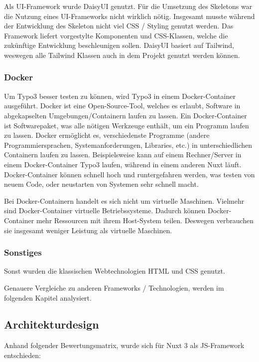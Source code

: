 Als UI-Framework wurde DaisyUI genutzt. Für die Umsetzung des Skeletons war die Nutzung eines UI-Frameworks nicht wirklich nötig. Insgesamt musste während der Entwicklung des Skeleton nicht viel CSS / Styling genutzt werden. Das Framework liefert vorgestylte Komponenten und CSS-Klassen, welche die zukünftige Entwicklung beschleunigen sollen. DaisyUI basiert auf Tailwind, weswegen alle Tailwind Klassen auch in dem Projekt genutzt werden können.

\subsubsection{Docker}
\label{sec:Docker}

Um Typo3 besser testen zu können, wird Typo3 in einem Docker-Container ausgeführt. Docker ist eine Open-Source-Tool, welches es erlaubt, Software in abgekapselten Umgebungen/Containern laufen zu lassen. Ein Docker-Container ist Softwarepaket, was alle nötigen Werkzeuge enthält, um ein Programm laufen zu lassen. Docker ermöglicht es, verschiedenste Programme (andere Programmiersprachen, Systemanforderungen, Libraries, etc.) in unterschiedlichen Containern laufen zu lassen. Beispielsweise kann auf einem Rechner/Server in einem Docker-Container Typo3 laufen, während in einem anderen Nuxt läuft. Docker-Container können schnell hoch und runtergefahren werden, was testen von neuem Code, oder neustarten von Systemen sehr schnell macht. 

Bei Docker-Containern handelt es sich nicht um virtuelle Maschinen. Vielmehr sind Docker-Container virtuelle Betriebssysteme. Dadurch können Docker-Container mehr Ressourcen mit ihrem Host-System teilen. Deswegen verbrauchen sie insgesamt weniger Leistung als virtuelle Maschinen.

\subsubsection{Sonstiges}
\label{sec:Sonstiges}

Sonst wurden die klassischen Webtechnologien HTML und CSS genutzt.

Genauere Vergleiche zu anderen Frameworks / Technologien, werden im folgenden Kapitel analysiert.


\subsection{Architekturdesign}
\label{sec:Architekturdesign}

Anhand folgender Bewertungsmatrix, wurde sich für Nuxt 3 als JS-Framework entschieden:

